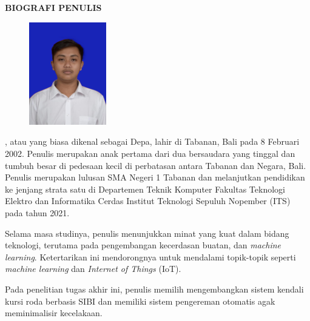 \begin{center}
  \Large
  \textbf{BIOGRAFI PENULIS}
\end{center}


\vspace{2ex}

\begin{figure}
  \centering
  \vspace{-3ex}
  \includegraphics[width=0.3\textwidth]{BiografiPenulis/BG BIRU.png}
  \vspace{-4ex}
\end{figure}

\name{}, atau yang biasa dikenal sebagai Depa, lahir di Tabanan, Bali pada 8 Februari 2002. Penulis merupakan anak pertama dari dua bersaudara yang tinggal dan tumbuh besar di pedesaan kecil di perbatasan antara Tabanan dan Negara, Bali. Penulis merupakan lulusan SMA Negeri 1 Tabanan dan melanjutkan pendidikan ke jenjang strata satu di Departemen Teknik Komputer Fakultas Teknologi Elektro dan Informatika Cerdas Institut Teknologi Sepuluh Nopember (ITS) pada tahun 2021.

Selama masa studinya, penulis menunjukkan minat yang kuat dalam bidang teknologi, terutama pada pengembangan kecerdasan buatan, dan \emph{machine learning}. Ketertarikan ini mendorongnya untuk mendalami topik-topik seperti \emph{machine learning} dan \emph{Internet of Things} (IoT).

Pada penelitian tugas akhir ini, penulis memilih mengembangkan sistem kendali kursi roda berbasis SIBI dan memiliki sistem pengereman otomatis agak meminimalisir kecelakaan.
